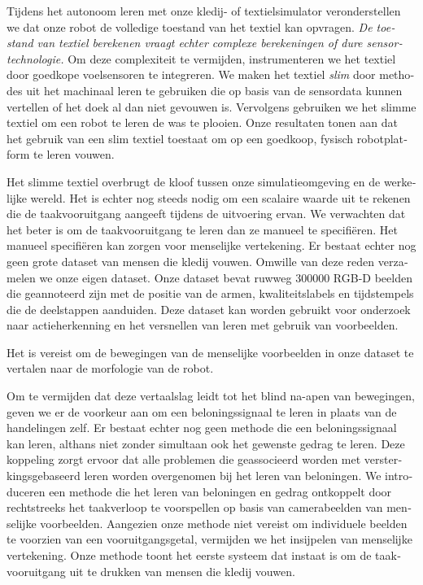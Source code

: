 \documentclass[\home/main.tex]{subfiles}
\begin{document}
\begin{otherlanguage}{dutch}
Tijdens het autonoom leren met onze kledij- of textielsimulator veronderstellen we dat onze robot de volledige toestand van het textiel kan opvragen. \emph{De toestand van textiel berekenen vraagt echter complexe berekeningen of dure sensortechnologie.} Om deze complexiteit te vermijden, instrumenteren we het textiel door goedkope voelsensoren te integreren. We maken het textiel \textit{slim} door methodes uit het machinaal leren te gebruiken die op basis van de sensordata kunnen vertellen of het doek al dan niet gevouwen is. Vervolgens gebruiken we het slimme textiel om een robot te leren de was te plooien. Onze resultaten tonen aan dat het gebruik van een slim textiel toestaat om op een goedkoop, fysisch robotplatform te leren vouwen.

Het slimme textiel overbrugt de kloof tussen onze simulatieomgeving en de werkelijke wereld. Het is echter nog steeds nodig om een scalaire waarde uit te rekenen die de taakvooruitgang aangeeft tijdens de uitvoering ervan.
We verwachten dat het beter is om de taakvooruitgang te leren dan ze manueel te specifiëren. Het manueel specifiëren kan zorgen voor menselijke vertekening.  
Er bestaat echter nog geen grote dataset van mensen die kledij vouwen. Omwille van deze reden verzamelen we onze eigen dataset. Onze dataset bevat ruwweg \qty{300000}{} RGB-D beelden die geannoteerd zijn met de positie van de armen, kwaliteitslabels en tijdstempels die de deelstappen aanduiden. Deze dataset kan worden gebruikt voor onderzoek naar actieherkenning en het versnellen van leren met gebruik van voorbeelden.

Het is vereist om de bewegingen van de menselijke voorbeelden in onze dataset te vertalen naar de morfologie van de robot. 

Om te vermijden dat deze vertaalslag leidt tot het blind na-apen van bewegingen, geven we er de voorkeur aan om een beloningssignaal te leren in plaats van de handelingen zelf.
Er bestaat echter nog geen methode die een beloningssignaal kan leren, althans niet zonder simultaan ook het gewenste gedrag te leren. Deze koppeling zorgt ervoor dat alle problemen die geassocieerd worden met versterkingsgebaseerd leren worden overgenomen bij het leren van beloningen. 
We introduceren een methode die het leren van beloningen en gedrag ontkoppelt door rechtstreeks het taakverloop te voorspellen op basis van camerabeelden van menselijke voorbeelden. Aangezien onze methode niet vereist om individuele beelden te voorzien van een vooruitgangsgetal, vermijden we het insijpelen van menselijke vertekening. Onze methode toont het eerste systeem dat instaat is om de taakvooruitgang uit te drukken van mensen die kledij vouwen. 


\end{otherlanguage}
\end{document}
